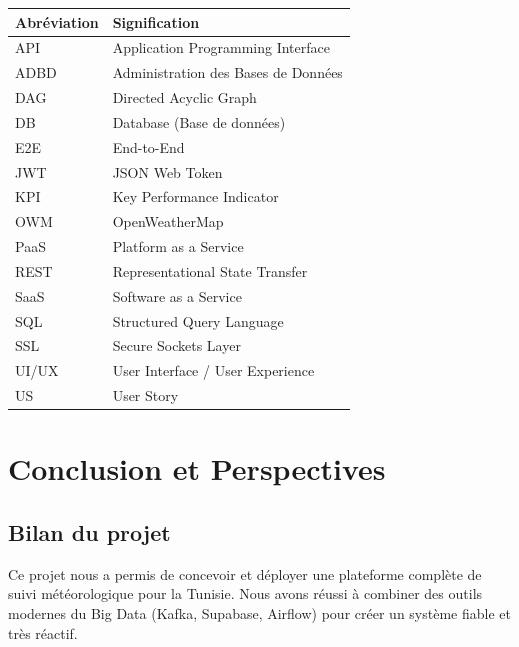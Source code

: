 \documentclass[a4paper,12pt,oneside]{report}
\begin{document}
\begin{tabularx}{\textwidth}{lX}
\toprule
\textbf{Abréviation} & \textbf{Signification} \\
\midrule
API     & Application Programming Interface \\
ADBD    & Administration des Bases de Données \\
DAG     & Directed Acyclic Graph \\
DB      & Database (Base de données) \\
E2E     & End-to-End \\
JWT     & JSON Web Token \\
KPI     & Key Performance Indicator \\
OWM     & OpenWeatherMap \\
PaaS    & Platform as a Service \\
REST    & Representational State Transfer \\
SaaS    & Software as a Service \\
SQL     & Structured Query Language \\
SSL     & Secure Sockets Layer \\
UI/UX   & User Interface / User Experience \\
US      & User Story \\
\bottomrule
\end{tabularx}

\newpage

\tableofcontents
\newpage
\listoffigures
{}
\newpage
\listoftables
{}
\newpage








\chapter*{Conclusion et Perspectives}

\section*{Bilan du projet}
Ce projet nous a permis de concevoir et déployer une plateforme complète de suivi météorologique pour la Tunisie. Nous avons réussi à combiner des outils modernes du Big Data (Kafka, Supabase, Airflow) pour créer un système fiable et très réactif.
\end{document}

